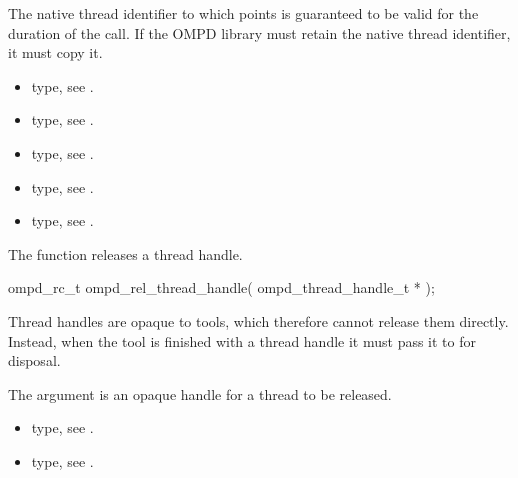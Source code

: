 The native thread identifier to which  points is guaranteed 
to be valid  for the duration of the call. If the OMPD library must retain 
the native thread identifier, it must copy it.

\crossreferences
\begin{itemize}
\item {} type, see .

\item {} type, see .

\item {} type, 
see .

\item {} type, 
see .

\item {} type, see .
\end{itemize}



\label{subsubsubsec:ompd_rel_thread_handle}
\summary
The  function releases a thread handle.

\format
\begin{cspecific}
\begin{ompSyntax}
ompd_rc_t ompd_rel_thread_handle(
  ompd_thread_handle_t *
);
\end{ompSyntax}
\end{cspecific}

\descr
Thread handles are opaque to tools, which therefore cannot release them 
directly. Instead, when the tool is finished with a thread handle it must 
pass it to  for disposal.

\argdesc
The  argument is an opaque handle for a thread to be released.

\crossreferences
\begin{itemize}
\item {} type, 
see .

\item {} type, see .
\end{itemize}



